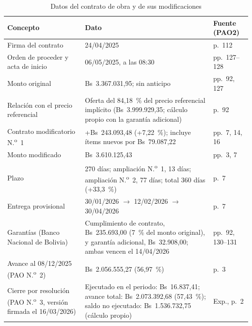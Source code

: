 \begin{table}[H]
\caption{Datos del contrato de obra y de sus modificaciones}
\label{tab:datos-contractuales}
\setlength{\tabcolsep}{4pt}
\begin{tabularx}{\linewidth}{@{}P{4.6cm}LP{2.4cm}@{}}
\toprule
\textbf{Concepto} & \textbf{Dato} & \textbf{Fuente (PAO2)} \\
\midrule
Firma del contrato & 24/04/2025 & p.~112 \\
Orden de proceder y acta de inicio & 06/05/2025, a las 08:30 & pp.~127--128 \\
Monto original & Bs~3.367.031,95; sin anticipo & pp.~92, 127 \\
Relación con el precio referencial & Oferta del 84,18~\% del precio referencial implícito (Bs~3.999.929,35; cálculo propio con la garantía adicional) & p.~92 \\
Contrato modificatorio N.\textsuperscript{o}~1 & +Bs~243.093,48 (+7,22~\%); incluye ítems nuevos por Bs~79.087,22 & pp.~7, 14, 16 \\
Monto modificado & Bs~3.610.125,43 & pp.~3, 7 \\
Plazo & 270 días; ampliación N.\textsuperscript{o}~1, 13 días; ampliación N.\textsuperscript{o}~2, 77 días; total 360 días (+33,3~\%) & p.~7 \\
Entrega provisional & 30/01/2026 $\rightarrow$ 12/02/2026 $\rightarrow$ 30/04/2026 & p.~7 \\
Garantías (Banco Nacional de Bolivia) & Cumplimiento de contrato, Bs~235.693,00 (7~\% del monto original), y garantía adicional, Bs~32.908,00; ambas vencen el 14/04/2026 & pp.~92, 130--131 \\
Avance al 08/12/2025 (PAO N.\textsuperscript{o}~2) & Bs~2.056.555,27 (56,97~\%) & p.~3 \\
Cierre por resolución (PAO N.\textsuperscript{o}~3, versión firmada el 16/03/2026) & Ejecutado en el periodo: Bs~16.837,41; avance total: Bs~2.073.392,68 (57,43~\%); saldo no ejecutado: Bs~1.536.732,75 (cálculo propio) & Exp., p.~2 \\
\bottomrule
\end{tabularx}
\end{table}


